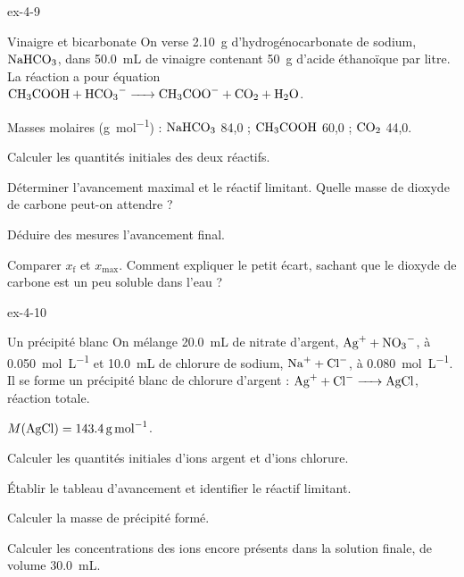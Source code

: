 \begin{blocLivre}{ex-4-9}
\begin{exercice}[2]{Vinaigre et bicarbonate}
On verse \qty{2,10}{g} d'hydrogénocarbonate de sodium, $\ce{NaHCO3}$, dans \qty{50,0}{mL} de vinaigre contenant \qty{50}{g} d'acide éthanoïque
par litre. La réaction a pour équation $\ce{CH3COOH + HCO3- -> CH3COO- + CO2 + H2O}$.
\begin{donnees}
Masses molaires (\unit{g.mol^{-1}}) : $\ce{NaHCO3}$ 84,0 ; $\ce{CH3COOH}$ 60,0 ; $\ce{CO2}$ 44,0.
\end{donnees}
\begin{questions}
\item Calculer les quantités initiales des deux réactifs.
\item Déterminer l'avancement maximal et le réactif limitant. Quelle masse de dioxyde de carbone peut-on attendre ?
\item Déduire des mesures l'avancement final.
\item Comparer $x_\mathrm{f}$ et $x_\mathrm{max}$. Comment expliquer le petit écart, sachant que le dioxyde de carbone est un peu soluble dans l'eau ?
\end{questions}
\end{exercice}
\end{blocLivre}
\begin{blocLivre}{ex-4-10}
\begin{exercice}[2]{Un précipité blanc}
On mélange \qty{20,0}{mL} de nitrate d'argent, $\ce{Ag+}+\ce{NO3-}$, à \qty{0,050}{mol.L^{-1}} et \qty{10,0}{mL} de chlorure de sodium,
$\ce{Na+}+\ce{Cl-}$, à \qty{0,080}{mol.L^{-1}}. Il se forme un précipité blanc de chlorure d'argent : $\ce{Ag+ + Cl- -> AgCl}$, réaction totale.
\begin{donnees}
$M(\ce{AgCl})=\qty{143,4}{g.mol^{-1}}$.
\end{donnees}
\begin{questions}
\item Calculer les quantités initiales d'ions argent et d'ions chlorure.
\item Établir le tableau d'avancement et identifier le réactif limitant.
\item Calculer la masse de précipité formé.
\item Calculer les concentrations des ions encore présents dans la solution finale, de volume \qty{30,0}{mL}.
\end{questions}
\end{exercice}
\end{blocLivre}
